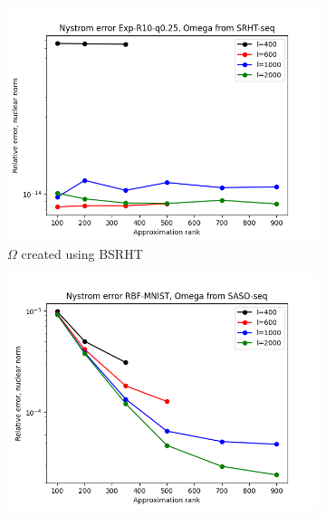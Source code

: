 \documentclass{article}
\theoremstyle{definition}
\begin{document}
\begin{appendices}
\begin{figure}
\begin{subfigure}[t]{\textwidth+20pt\relax}
    \includegraphics[width=\dimexpr\linewidth-20pt\relax]{plots/relerror/relerror_Exp-R10-q0.25_SRHT-seq.png}
    \caption{$\Omega$ created using BSRHT}
\end{subfigure}\hfill
\begin{subfigure}[t]{0.35\textwidth}
    \includegraphics[width=\textwidth]{plots/relerror/relerror_RBF-MNIST_SASO-seq.png}

\end{subfigure}
\end{figure}
\end{appendices}
\end{document}
